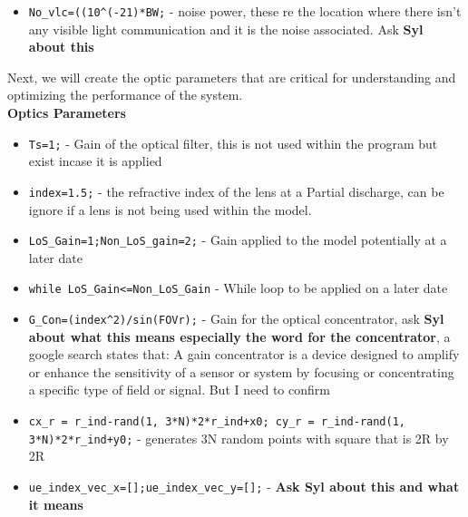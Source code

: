 \begin{itemize}
    \item \verb|No_vlc=((10^(-21)*BW;| - noise power, these re the location where there isn't any visible light communication and it is the noise associated. Ask \textbf{Syl about this} %
\end{itemize}

Next, we will create the optic parameters that are critical for understanding and optimizing the performance of the system. \\

\textbf{Optics Parameters} 
\begin{itemize}
    \item \verb|Ts=1;| - Gain of the optical filter, this is not used within the program but exist incase it is applied
    \item \verb|index=1.5;| - the refractive index of the lens at a Partial discharge, can be ignore if a lens is not being used within the model.
    \item \verb|LoS_Gain=1;Non_LoS_gain=2;| - Gain applied to the model potentially at a later date
    \item \verb|while LoS_Gain<=Non_LoS_Gain| - While loop to be applied on a later date
    \item \verb|G_Con=(index^2)/sin(FOVr);| - Gain for the optical concentrator, ask \textbf{Syl about what this means especially the word for the concentrator}, a google search states that: A gain concentrator is a device designed to amplify or enhance the sensitivity of a sensor or system by focusing or concentrating a specific type of field or signal. But I need to confirm
    \item \verb|cx_r = r_ind-rand(1, 3*N)*2*r_ind+x0; cy_r = r_ind-rand(1, 3*N)*2*r_ind+y0;| - generates 3N random points with square that is 2R by 2R
    \item \verb|ue_index_vec_x=[];ue_index_vec_y=[];| - \textbf{Ask Syl about this and what it means}
\end{itemize}

